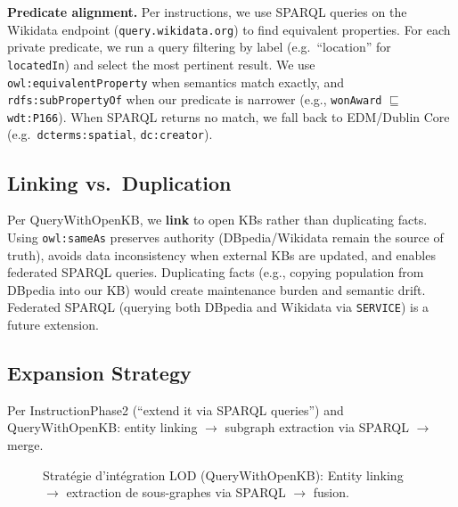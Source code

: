 \documentclass[11pt,a4paper]{article}
\begin{document}
  \textbf{Predicate alignment.} Per instructions, we use SPARQL queries on the Wikidata endpoint (\texttt{query.wikidata.org}) to find equivalent properties. For each private predicate, we run a query filtering by label (e.g.\ ``location'' for \texttt{locatedIn}) and select the most pertinent result. We use \texttt{owl:equivalentProperty} when semantics match exactly, and \texttt{rdfs:subPropertyOf} when our predicate is narrower (e.g., \texttt{wonAward} $\sqsubseteq$ \texttt{wdt:P166}). When SPARQL returns no match, we fall back to EDM/Dublin Core (e.g.\ \texttt{dcterms:spatial}, \texttt{dc:creator}).

  \subsection{Linking vs.\ Duplication}

  Per QueryWithOpenKB, we \textbf{link} to open KBs rather than duplicating facts. Using \texttt{owl:sameAs} preserves authority (DBpedia/Wikidata remain the source of truth), avoids data inconsistency when external KBs are updated, and enables federated SPARQL queries. Duplicating facts (e.g., copying population from DBpedia into our KB) would create maintenance burden and semantic drift. Federated SPARQL (querying both DBpedia and Wikidata via \texttt{SERVICE}) is a future extension.

  \subsection{Expansion Strategy}

  Per InstructionPhase2 (``extend it via SPARQL queries'') and QueryWithOpenKB: entity linking $\rightarrow$ subgraph extraction via SPARQL $\rightarrow$ merge.

  \begin{figure}[ht]
  \centering
  \caption{Stratégie d'intégration LOD (QueryWithOpenKB): Entity linking $\rightarrow$ extraction de sous-graphes via SPARQL $\rightarrow$ fusion.}
  \end{figure}
\end{document}
